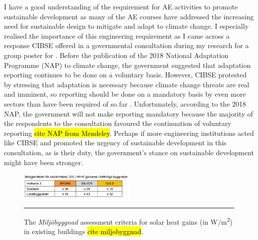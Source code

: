 I have a good understanding of the requirement for AE activities to promote sustainable development as many of the AE courses have addressed the increasing need for sustainable design to mitigate and adapt to climate change.
I especially realised the importance of this engineering requirement as I came across a response CIBSE offered in a governmental consultation during my research for a group poster for \CCSATitle.
Before the publication of the 2018 National Adaptation Programme (NAP) to climate change, 
the government suggested that adaptation reporting continues to be done on a voluntary basis.
However, CIBSE protested by stressing that adaptation is necessary because climate change threats are real and imminent, so reporting should be done on a mandatory basis by even more sectors than have been required of so far \citep{CIBSE:CCAreporting}.
Unfortunately, according to the 2018 NAP, the government will not make reporting mandatory because the majority of the respondents to the consultation favoured the continuation of voluntary reporting \hl{cite NAP from Mendeley}.
Perhaps if more engineering institutions acted like CIBSE and promoted the urgency of sustainable development in this consultation, as is their duty, the government's stance on sustainable development might have been stronger.

\begin{figure}
	\centering
	\includegraphics[width=0.5\textwidth]{figures/SVL.PNG}
	\rule{0.5\textwidth}{0.5pt} %
	\caption[The \textit{Miljöbyggnad} assessment criteria for solar heat gains in existing buildings.]{The \textit{Miljöbyggnad} assessment criteria for solar heat gains (in W/m\textsuperscript{2}) in existing buildings \hl{cite miljobyggnad}.}
	\label{fig:svl}
\end{figure}

